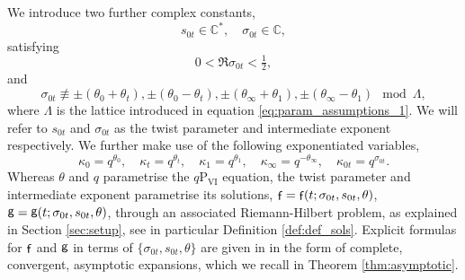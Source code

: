 \documentclass[a4paper,reqno,11pt]{amsart}
\numberwithin{equation}{section}
\numberwithin{figure}{section}
\theoremstyle{plain}
\theoremstyle{remark}
\DeclareMathOperator{\sff}{{\sf f}}
\DeclareMathOperator{\sfg}{{\sf g}}
\newcommand\Psix{\textrm{P}_{\textrm{VI}}}
\numberwithin{rhp}{section}
\begin{document}
We introduce two further complex constants, 
\begin{equation}\label{eq:int_constants}
    s_{0t}\in\mathbb{C}^*,\quad \sigma_{0t}\in\mathbb{C},
\end{equation}
satisfying
\begin{equation}\label{eq:sigma_ineq}
    0<\Re\sigma_{0t}<\tfrac{1}{2},
\end{equation}
and
\begin{equation}\label{eq:sigmaconds}
    \sigma_{0t}\not\equiv \pm (\theta_0+\theta_t),\pm (\theta_0-\theta_t),\pm (\theta_\infty+\theta_1),\pm (\theta_\infty-\theta_1) \mod{\Lambda},
\end{equation}
where $\Lambda$ is the lattice introduced in equation \eqref{eq:param_assumptions_1}.
We will refer to $s_{0t}$ and $\sigma_{0t}$ as the twist parameter and intermediate exponent respectively.
We further make use of the following exponentiated variables,
\begin{equation}\label{eq:kappa_def}
    \kappa_0=q^{\theta_0},\quad \kappa_t=q^{\theta_t},\quad \kappa_1=q^{\theta_1},\quad \kappa_\infty=q^{-\theta_\infty},\quad \kappa_{0t}=q^{\sigma_{0t}}.
\end{equation}
Whereas $\theta$ and $q$ parametrise the $q\Psix$ equation, the twist parameter and intermediate exponent parametrise its solutions, $\sff=\sff(t;\sigma_{0t},s_{0t},\theta)$, $\sfg=\sfg(t;\sigma_{0t},s_{0t},\theta)$, through an associated Riemann-Hilbert problem, as explained in Section \ref{sec:setup}, see in particular Definition \ref{def:def_sols}. Explicit formulas for $\sff$ and $\sfg$ in terms of $\{\sigma_{0t},s_{0t},\theta\}$ are given in \cite[Theorem 2.14]{roffelsen2024segre} in the form of complete, convergent, asymptotic expansions, which we recall in Theorem \ref{thm:asymptotic}.
\end{document}

